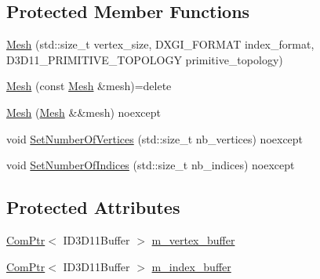 \subsection*{Protected Member Functions}
\begin{DoxyCompactItemize}
\item 
\mbox{\hyperlink{classmage_1_1rendering_1_1_mesh_abb8f1d3c14716417f052a9440bde0536}{Mesh}} (std\+::size\+\_\+t vertex\+\_\+size, D\+X\+G\+I\+\_\+\+F\+O\+R\+M\+AT index\+\_\+format, D3\+D11\+\_\+\+P\+R\+I\+M\+I\+T\+I\+V\+E\+\_\+\+T\+O\+P\+O\+L\+O\+GY primitive\+\_\+topology)
\item 
\mbox{\hyperlink{classmage_1_1rendering_1_1_mesh_a42e4cab2db663fa8d7f2c8651f30894b}{Mesh}} (const \mbox{\hyperlink{classmage_1_1rendering_1_1_mesh}{Mesh}} \&mesh)=delete
\item 
\mbox{\hyperlink{classmage_1_1rendering_1_1_mesh_aeb090ec9531823157f010a70a9dabf45}{Mesh}} (\mbox{\hyperlink{classmage_1_1rendering_1_1_mesh}{Mesh}} \&\&mesh) noexcept
\item 
void \mbox{\hyperlink{classmage_1_1rendering_1_1_mesh_aaf39656d181c9e0cd37aa58164e9c747}{Set\+Number\+Of\+Vertices}} (std\+::size\+\_\+t nb\+\_\+vertices) noexcept
\item 
void \mbox{\hyperlink{classmage_1_1rendering_1_1_mesh_a25b24a6009546e950d5721a0c9ce6d81}{Set\+Number\+Of\+Indices}} (std\+::size\+\_\+t nb\+\_\+indices) noexcept
\end{DoxyCompactItemize}
\subsection*{Protected Attributes}
\begin{DoxyCompactItemize}
\item 
\mbox{\hyperlink{namespacemage_ae74f374780900893caa5555d1031fd79}{Com\+Ptr}}$<$ I\+D3\+D11\+Buffer $>$ \mbox{\hyperlink{classmage_1_1rendering_1_1_mesh_aa3cf2b0ad192e2b3b371655ee49eb4f4}{m\+\_\+vertex\+\_\+buffer}}
\item 
\mbox{\hyperlink{namespacemage_ae74f374780900893caa5555d1031fd79}{Com\+Ptr}}$<$ I\+D3\+D11\+Buffer $>$ \mbox{\hyperlink{classmage_1_1rendering_1_1_mesh_a113b12e839a22e62cb45991805586689}{m\+\_\+index\+\_\+buffer}}
\end{DoxyCompactItemize}

